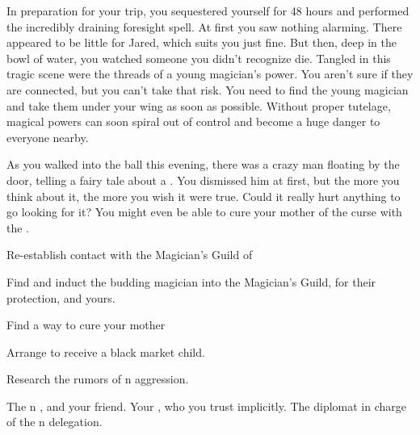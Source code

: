 \documentclass[char]{NeptuneBall}
\begin{document}
In preparation for your trip, you sequestered yourself for 48 hours and performed the incredibly draining foresight spell. At first you saw nothing alarming. There appeared to be little for Jared, which suits you just fine. But then, deep in the bowl of water, you watched someone you didn't recognize die. Tangled in this tragic scene were the threads of a young magician's power. You aren't sure if they are connected, but you can't take that risk. You need to find the young magician and take them under your wing as soon as possible. Without proper tutelage, magical powers can soon spiral out of control and become a huge danger to everyone nearby.

As you walked into the ball this evening, there was a crazy man floating by the door, telling a fairy tale about a \iWishingStone{\MYname}. You dismissed him at first, but the more you think about it, the more you wish it were true. Could it really hurt anything to go looking for it? You might even be able to cure your mother of the curse with the \iWishingStone{\MYname}.

\begin{itemz}[Goals]
  \item Re-establish contact with the Magician's Guild of \pAtlantis{}
  \item Find and induct the budding magician into the Magician's Guild, for their protection, and yours.
  \item Find a way to cure your mother
  \item Arrange to receive a black market child.
  \item Research the rumors of \pIndia{}n aggression.
\end{itemz}

\begin{contacts}
  \contact{\cDancer{}} The \pPacifica{}n \cDancer{\Prince}, and your friend.
  \contact{\cKGB{}} Your \cKGB{\sibling}, who you trust implicitly.
  \contact{\cDiplomat{}} The diplomat in charge of the \pPacifica{}n delegation.
\end{contacts}
\end{document}
